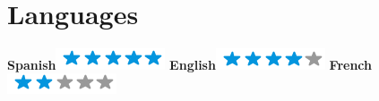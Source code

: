 \begin{aside}
    ~
    ~
    ~
    ~
    ~
    ~
    ~
    ~
    ~
    ~
    ~
    ~
    ~
    ~
    ~
    ~
    ~
    ~
    ~
    ~
    ~
    ~
    ~
    ~
    ~
    ~
    ~
    ~
    \section{Languages}
    \textbf{Spanish}\includegraphics[scale=0.40]{img/5stars.png}
    \textbf{English}\includegraphics[scale=0.40]{img/4stars.png}
    \textbf{French}\includegraphics[scale=0.40]{img/2stars.png}
\end{aside}
